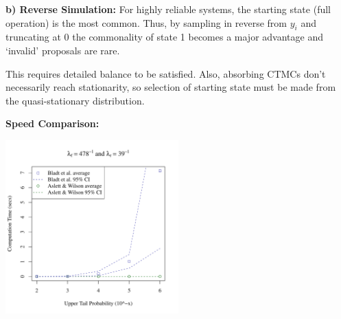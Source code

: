 \documentclass[final,a1paper]{baposter}
\begin{document}
\begin{poster}
{\begin{multicols}{2}
		\vspace{0.5em}
		\textbf{b) Reverse Simulation:} For highly reliable systems, the starting state (full operation) is the most common.  Thus, by sampling in reverse from $y_i$ and truncating at 0 the commonality of state 1 becomes a major advantage and `invalid' proposals are rare.
		
		\vspace{0.5em}
		This requires detailed balance to be satisfied.  Also, absorbing CTMCs don't necessarily reach stationarity, so selection of starting state must be made from the quasi-stationary distribution.
		
	\vspace{0.5em}
		\textbf{Speed Comparison:}
		
		\vspace{-1em}
		\includegraphics[width=0.5\textwidth]{SPEED}
	\end{multicols}

}


\end{poster}%
\end{document}
